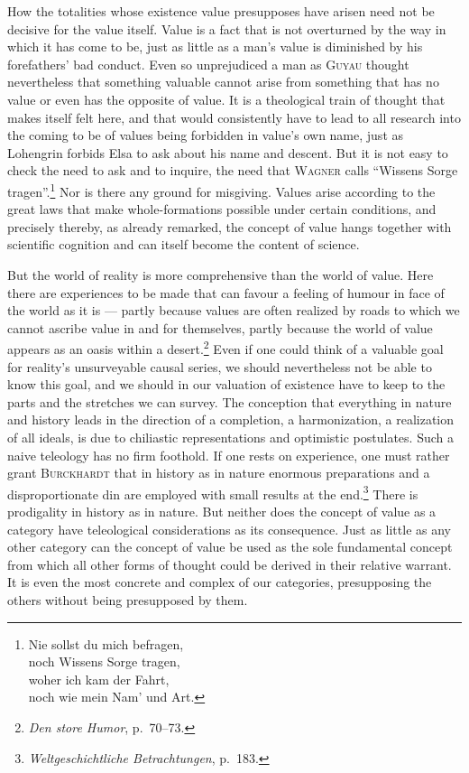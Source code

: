 \documentclass[12pt]{book}
\newcommand{\opage}[1]{\marginnote{\footnotesize\textit{[#1]}}}
\begin{document}
How the totalities whose existence value presupposes have arisen need not be decisive for
the value itself. Value is a fact that is not overturned by the way in which it has come
to be, just as little as a man's value is diminished by his forefathers' bad conduct. Even
so unprejudiced a man as \textsc{Guyau} thought nevertheless that something valuable
cannot arise from something that has no value or even has the opposite of value. It is a
theological train of thought that makes itself felt here, and that would consistently have
to lead to all research into the coming to be of values being forbidden in value's own
name, just as Lohengrin forbids Elsa to ask about his name and descent. But it is not easy
to check the need to ask and to inquire, the need that \textsc{Wagner} calls ``Wissens
Sorge tragen''.\footnote{Nie sollst du mich befragen,\\ noch Wissens Sorge tragen,\\
woher ich kam der Fahrt,\\ noch wie mein Nam' und Art.} Nor is there any ground for
misgiving. Values arise according to the great laws that make whole-formations possible
under certain conditions, and precisely thereby, as already remarked, the concept of value
hangs together with scientific cognition and can itself become the content of science.

But the world of reality is more comprehensive than the world of value. Here there are
experiences to be made that can favour a feeling of humour in face of the world as it is
--- partly because values are often realized by roads to which we cannot ascribe \opage{73}value in
and for themselves, partly because the world of value appears as an oasis within a
desert.\footnote{\textit{Den store Humor}, p.\ 70--73.} Even if one could think of a
valuable goal for reality's unsurveyable causal series, we should nevertheless not be able
to know this goal, and we should in our valuation of existence have to keep to the parts
and the stretches we can survey. The conception that everything in nature and history
leads in the direction of a completion, a harmonization, a realization of all ideals, is
due to chiliastic representations and optimistic postulates. Such a naive teleology has no
firm foothold. If one rests on experience, one must rather grant \textsc{Burckhardt} that
in history as in nature enormous preparations and a disproportionate din are employed with
small results at the end.\footnote{\textit{Weltgeschichtliche Betrachtungen}, p.\ 183.}
There is prodigality in history as in nature. But neither does the concept of value as a
category have teleological considerations as its consequence. Just as little as any other
category can the concept of value be used as the sole fundamental concept from which all
other forms of thought could be derived in their relative warrant. It is even the most
concrete and complex of our categories, presupposing the others without being presupposed
by them.
\end{document}
